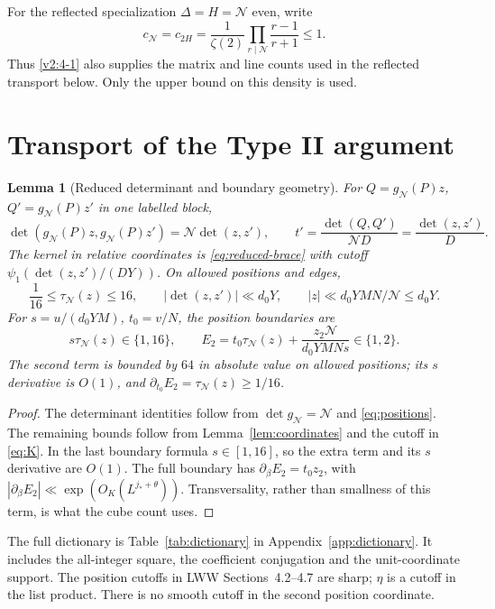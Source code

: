 \documentclass[11pt]{article}
\newtheorem{lemma}[theorem]{Lemma}
\theoremstyle{definition}
\newcommand{\GN}{\mathcal N}
\newcommand{\tauN}{\tau_{\GN}}
\newcommand{\gN}{g_{\GN}}
\theoremstyle{remark}
\numberwithin{equation}{section}
\begin{document}
For the reflected specialization $\Delta=H=\GN$ even, write
\begin{equation}\label{eq:cN}
 c_{\GN}=c_{2H}=\frac1{\zeta(2)}
           \prod_{r\mid\GN}\frac{r-1}{r+1}\le1.
\end{equation}
Thus \eqref{v2:4-1} also supplies the matrix and line counts used
in the reflected transport below. Only the upper bound on this
density is used.

\section{Transport of the Type II argument}\label{sec:transport}
\begin{lemma}[Reduced determinant and boundary geometry]\label{lem:transport-geometry}
For $Q=\gN(P)z$, $Q'=\gN(P)z'$ in one labelled block,
\begin{equation}\label{eq:reduced-det}
 \det(\gN(P)z,\gN(P)z')=\GN\det(z,z'),\qquad
 t'=\frac{\det(Q,Q')}{\GN D}=\frac{\det(z,z')}{D}.
\end{equation}
The kernel in relative coordinates is \eqref{eq:reduced-brace} with
cutoff $\psi_1(\det(z,z')/(DY))$. On allowed positions and edges,
\begin{equation}\label{eq:path-geometry}
 \frac1{16}\le\tauN(z)\le16,\qquad
 |\det(z,z')|\ll d_0Y,\qquad |z|\ll d_0YMN/\GN\le d_0Y.
\end{equation}
For $s=u/(d_0YM)$, $t_0=v/N$, the position boundaries are
\begin{equation}\label{eq:boundaries}
 s\tauN(z)\in\{1,16\},\qquad
 E_2=t_0\tauN(z)+\frac{z_2\GN}{d_0YMNs}\in\{1,2\}.
\end{equation}
The second term is bounded by $64$ in absolute value on allowed
positions; its $s$ derivative is $O(1)$, and
$\partial_{t_0}E_2=\tauN(z)\ge1/16$.
\end{lemma}
\begin{proof}
The determinant identities follow from $\det\gN=\GN$ and
\eqref{eq:positions}. The remaining bounds follow from
Lemma~\ref{lem:coordinates} and the cutoff in \eqref{eq:K}.
In the last boundary formula $s\in[1,16]$, so the extra term and its
$s$ derivative are $O(1)$. The full boundary has
$\partial_\beta E_2=t_0z_2$, with
$|\partial_\beta E_2|\ll\exp(O_K(L^{j_*+\theta}))$. Transversality, rather than smallness of
this term, is what the cube count uses.
\end{proof}

The full dictionary is Table~\ref{tab:dictionary} in
Appendix~\ref{app:dictionary}. It includes the all-integer square,
the coefficient conjugation and the unit-coordinate support.
The position cutoffs in LWW Sections~4.2--4.7 are sharp;
$\eta$ is a cutoff in the list product. There is no smooth cutoff
in the second position coordinate.
\end{document}
